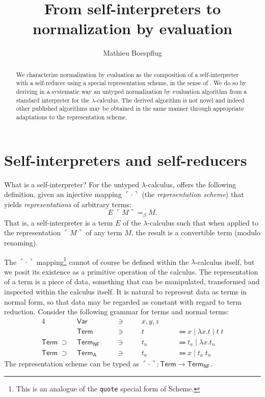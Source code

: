 \documentclass[a4paper]{amsart}
\author{Mathieu Boespflug}
\title{From self-interpreters to normalization by evaluation}
\newcommand{\quot}[1]{\ulcorner#1\urcorner}
\newcommand{\sep}{\;|\;}
\newcommand{\Var}{\mathsf{Var}\;}
\newcommand{\Term}{\mathsf{Term}}
\newcommand{\Termnf}{\mathsf{Term_{NF}}}
\newcommand{\Terma}{\mathsf{Term_{A}}}
\begin{document}
\maketitle

\begin{abstract}
  We characterize normalization by evaluation as the composition of a
  self-interpreter with a self-reducer using a special representation scheme,
  in the sense of \citet{mogensen:selfint}. We do so by deriving in a
  systematic way an untyped normalization by evaluation algorithm from a
  standard interpreter for the $\lambda$-calculus. The derived algorithm is
  not novel and indeed other published algorithms may be obtained in the same
  manner through appropriate adaptations to the representation scheme.
\end{abstract}

\section{Self-interpreters and self-reducers}
What is a self-interpreter? For the untyped $\lambda$-calculus,
\citet{mogensen:selfint} offers the following definition, given an injective
mapping $\quot\cdot$ (the {\em representation scheme}) that yields {\em
  representations} of arbitrary terms:
\[
E\;\quot M =_\beta M.
\]
That is, a self-interpreter is a term $E$ of the $\lambda$-calculus such that
when applied to the representation $\quot M$ of any term $M$, the result is a
convertible term (modulo renaming).



The $\quot\cdot$ mapping\footnote{This is an analogue of the \texttt{quote}
  special form of Scheme.} cannot of course be defined within the
$\lambda$-calculus itself, but we posit its existence as a primitive operation
of the calculus. The representation of a term is a piece of data, something
that can be manipulated, transformed and inspected within the calculus itself.
It is natural to represent data as terms in normal form, so that data may be
regarded as constant with regard to term reduction. Consider the following
grammar for terms and normal terms:
\begin{alignat*}{4}
&\Var    &\quad&\ni&\quad& x, y, z \\
&\Term   &\quad&\ni&\quad& t   &\quad&\Coloneqq x \sep \lambda x.t \sep t\;t \\
\Term \;\supset\; &\Termnf &\quad&\ni&\quad& t_n &\quad&\Coloneqq t_a \sep \lambda x.t_n \\
\Term \;\supset\; &\Terma  &\quad&\ni&\quad& t_a &\quad&\Coloneqq x \sep t_a\;t_n
\end{alignat*}
The representation scheme can be typed as $\quot\cdot : \Term \rightarrow
\Termnf$.
\end{document}
